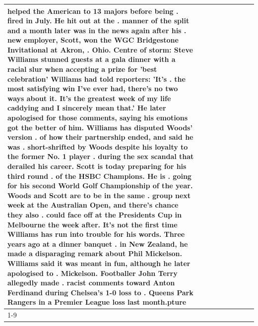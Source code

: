 \begin{table}[H]
\begin{tabular}{lllrlllll}
helped the American to 13 majors before being . fired in July. He hit out at the . manner of the split and a month later was in the news again after his . new employer, Scott, won the WGC Bridgestone Invitational at Akron, . Ohio. Centre of storm: Steve Williams stunned guests at a gala dinner with a racial slur when accepting a prize for 'best celebration' Williams had told reporters: 'It's . the most satisfying win I've ever had, there's no two ways about it. It's the greatest week of my life caddying and I sincerely mean that.' He later apologised for those comments, saying his emotions got the better of him. Williams has disputed Woods' version . of how their partnership ended, and said he was . short-shrifted by Woods despite his loyalty to the former No. 1 player . during the sex scandal that derailed his career. Scott is today preparing for his third round . of the HSBC Champions. He is . going for his second World Golf Championship of the year. Woods and Scott are to be in the same . group next week at the Australian Open, and there's chance they also . could face off at the Presidents Cup in Melbourne the week after. It's not the first time Williams has run into trouble for his words. Three years ago at a dinner banquet . in New Zealand, he made a disparaging remark about Phil Mickelson. Williams said it was meant in fun, although he later apologised to . Mickelson. Footballer John Terry allegedly made . racist comments toward Anton Ferdinand during Chelsea's 1-0 loss to . Queens Park Rangers in a Premier League loss last month.pture \\
\cline{1-9}

\end{tabular}
\end{table}
